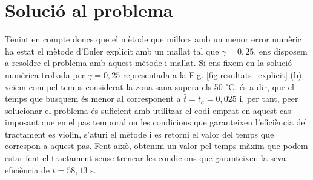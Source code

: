 \documentclass[11pt]{article}
\begin{document}
\section{Solució al problema}

Tenint en compte doncs que el mètode que millors amb un menor error numèric ha estat el mètode d'Euler explicit amb un mallat tal que $\gamma=0,25$, ens disposem a resoldre el problema amb aquest mètode i mallat. Si ens fixem en la solució numèrica trobada per $\gamma=0,25$ representada a la Fig. \ref{fig:resultats_explicit} (b), veiem com pel temps considerat la zona sana supera els 50 $^\circ$C, és a dir, que el temps que busquem és menor al corresponent a $\hat{t}=t_a=0,025$ i, per tant, peer solucionar el problema és suficient amb utilitzar el codi emprat en aquest cas imposant que en el pas temporal on les condicions que garanteixen l'eficiència del tractament es violin, s'aturi el mètode i es retorni el valor del temps que correspon a aquest pas. Fent això, obtenim un valor pel temps màxim que podem estar fent el tractament sense trencar les condicions que garanteixen la seva eficiència de $t=58,13$ s.
\end{document}
